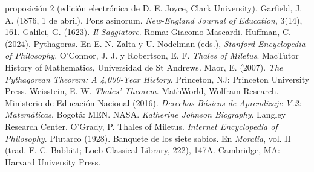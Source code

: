 \documentclass[11pt]{article}
\begin{document}
\begin{referencias}
  proposición 2 (edición electrónica de D. E. Joyce, Clark University).
 Garfield, J. A. (1876, 1 de abril). Pons asinorum.
  \emph{New-England Journal of Education}, 3(14), 161.
 Galilei, G. (1623). \emph{Il Saggiatore}. Roma: Giacomo
  Mascardi.
 Huffman, C. (2024). Pythagoras. En E. N. Zalta y
  U. Nodelman (eds.), \emph{Stanford Encyclopedia of Philosophy}.
 O'Connor, J. J. y Robertson, E. F. \emph{Thales of
  Miletus}. MacTutor History of Mathematics, Universidad de St Andrews.
 Maor, E. (2007). \emph{The Pythagorean Theorem: A 4,000-Year
  History}. Princeton, NJ: Princeton University Press.
 Weisstein, E. W. \emph{Thales' Theorem}. MathWorld,
  Wolfram Research.
 Ministerio de Educación Nacional (2016). \emph{Derechos
  Básicos de Aprendizaje V.2: Matemáticas}. Bogotá: MEN.
 NASA. \emph{Katherine Johnson Biography}. Langley
  Research Center.
 O'Grady, P. Thales of Miletus. \emph{Internet Encyclopedia
  of Philosophy}.
 Plutarco (1928). Banquete de los siete sabios. En
  \emph{Moralia}, vol. II (trad. F. C. Babbitt; Loeb Classical Library,
  222), 147A. Cambridge, MA: Harvard University Press.
\end{referencias}
\end{document}
